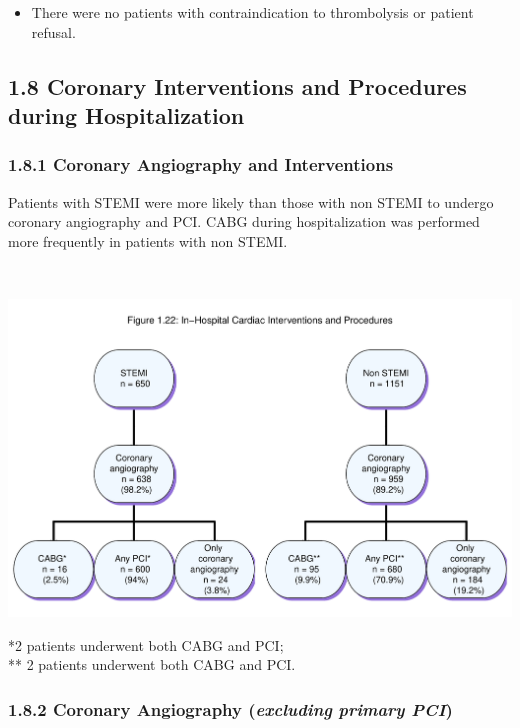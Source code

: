 \documentclass[
]{article}
\providecommand{\tightlist}{%
  \setlength{\itemsep}{0pt}\setlength{\parskip}{0pt}}
\begin{document}
\begin{itemize}
\tightlist
\item
  There were no patients with contraindication to thrombolysis or
  patient refusal.
\end{itemize}

\pagebreak

\subsection{1.8 Coronary Interventions and Procedures during
Hospitalization}\label{coronary-interventions-and-procedures-during-hospitalization}

\subsubsection{1.8.1 Coronary Angiography and
Interventions}\label{coronary-angiography-and-interventions}

Patients with STEMI were more likely than those with non STEMI to
undergo coronary angiography and PCI. CABG during hospitalization was
performed more frequently in patients with non STEMI.

~

\includegraphics{‏‏ACSIS_2024_v1_pdf_without_files/figure-latex/unnamed-chunk-74-1.pdf}

*2 patients underwent both CABG and PCI;\\
** 2 patients underwent both CABG and PCI.

\pagebreak

\subsubsection{\texorpdfstring{1.8.2 Coronary Angiography
(\textbf{\emph{excluding}} \emph{primary
PCI})}{1.8.2 Coronary Angiography (excluding primary PCI)}}\label{coronary-angiography-excluding-primary-pci}
\end{document}
